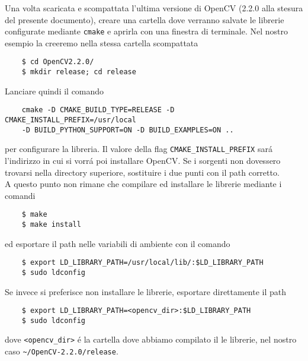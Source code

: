 \documentclass[12pt]{article}
\begin{document}
\noindent Una volta scaricata e scompattata l'ultima versione di OpenCV (2.2.0 alla stesura del presente documento), creare una cartella dove verranno salvate le librerie configurate mediante \verb|cmake| e aprirla con una finestra di terminale. Nel nostro esempio la creeremo nella stessa cartella scompattata

\begin{verbatim}
	$ cd OpenCV2.2.0/
	$ mkdir release; cd release
\end{verbatim}

\noindent Lanciare quindi il comando

\begin{verbatim}
	cmake -D CMAKE_BUILD_TYPE=RELEASE -D CMAKE_INSTALL_PREFIX=/usr/local
	-D BUILD_PYTHON_SUPPORT=ON -D BUILD_EXAMPLES=ON ..
\end{verbatim}

\noindent per configurare la libreria. Il valore della flag \verb|CMAKE_INSTALL_PREFIX| sar\'a l'indirizzo in cui si vorr\'a poi installare OpenCV. Se i sorgenti non dovessero trovarsi nella directory superiore, sostituire i due punti con il path corretto.\\

\noindent A questo punto non rimane che compilare ed installare le librerie mediante i comandi

\begin{verbatim}
	$ make
	$ make install
\end{verbatim}

\noindent ed esportare il path nelle variabili di ambiente con il comando

\begin{verbatim}
	$ export LD_LIBRARY_PATH=/usr/local/lib/:$LD_LIBRARY_PATH
	$ sudo ldconfig
\end{verbatim}

\noindent Se invece si preferisce non installare le librerie, esportare direttamente il path 

\begin{verbatim}
	$ export LD_LIBRARY_PATH=<opencv_dir>:$LD_LIBRARY_PATH
	$ sudo ldconfig
\end{verbatim}

\noindent dove \verb|<opencv_dir>| \'e la cartella dove abbiamo compilato il le librerie, nel nostro caso \verb|~/OpenCV-2.2.0/release|.
\end{document}
